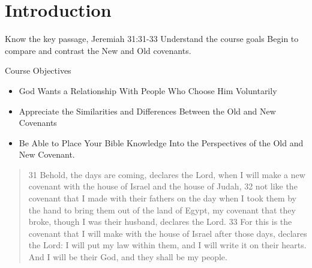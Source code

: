 \chapter{Introduction}
\begin{goals}
\goal Know the key passage, Jeremiah 31:31-33
\goal Understand the course goals
\goal Begin to compare and contrast the New and Old covenants.
\end{goals}
\intro
Course Objectives
\begin{itemize}
\item God Wants a Relationship With People Who Choose Him Voluntarily
\item Appreciate the Similarities and Differences Between the Old and New Covenants
\item Be Able to Place Your Bible Knowledge Into the Perspectives of the Old and New Covenant.
\end{itemize}

\bible
\begin{quote}
31 Behold, the days are coming, declares the Lord, when I will make a new covenant with the house of Israel and the house of Judah, 32 not like the covenant that I made with their fathers on the day when I took them by the hand to bring them out of the land of Egypt, my covenant that they broke, though I was their husband, declares the Lord. 33 For this is the covenant that I will make with the house of Israel after those days, declares the Lord: I will put my law within them, and I will write it on their hearts. And I will be their God, and they shall be my people. 
\end{quote}

